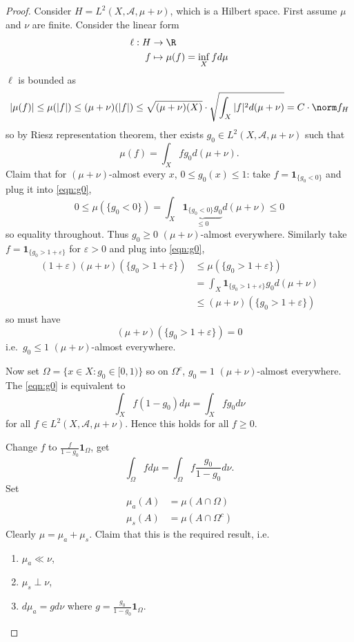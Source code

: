 \documentclass[a4paper]{article}
\begin{document}
\begin{proof}
  Consider \(H = L^2(X, \mathcal A, \mu + \nu)\), which is a Hilbert space. First assume \(\mu\) and \(\nu\) are finite. Consider the linear form
  \begin{align*}
    \ell: H &\to \R \\
    f &\mapsto \mu(f) = \inf_X f d\mu
  \end{align*}
  \(\ell\) is bounded as
  \[
    |\mu(f)|
    \leq \mu(|f|)
    \leq (\mu + \nu)(|f|)
    \leq \sqrt{(\mu + \nu)(X)} \cdot \sqrt{\int_X |f|^2 d(\mu + \nu)}
    = C \cdot \norm f_H
  \]
  so by Riesz representation theorem, ther exists \(g_0 \in L^2(X, \mathcal A, \mu + \nu)\) such that
  \[
    \label{eqn:g0}
    \mu(f) = \int_X fg_0 d(\mu + \nu).
    \tag{\ast}
  \]
  Claim that for \((\mu + \nu)\)-almost every \(x\), \(0 \leq g_0(x) \leq 1\): take \(f = \mathbf 1_{\{g_0 < 0\}}\) and plug it into \eqref{eqn:g0},
  \[
    0
    \leq \mu(\{g_0 < 0\})
    = \int_X \underbrace{\mathbf 1_{\{g_0 < 0\}} g_0}_{\leq 0} d(\mu + \nu)
    \leq 0
  \]
  so equality throughout. Thus \(g_0 \geq 0\) \((\mu + \nu)\)-almost everywhere. Similarly take \(f = \mathbf 1_{\{g_0 > 1 + \varepsilon\}}\) for \(\varepsilon > 0\) and plug into \eqref{eqn:g0},
  \begin{align*}
    (1 + \varepsilon)(\mu + \nu) (\{g_0 > 1 + \varepsilon\})
    &\leq \mu(\{g_0 > 1 + \varepsilon\}) \\
    &= \int_X \mathbf 1_{\{g_0 > 1 + \varepsilon\}} g_0 d(\mu + \nu) \\
    &\leq (\mu + \nu)(\{g_0 > 1 + \varepsilon\})
  \end{align*}
  so must have
  \[
    (\mu + \nu) (\{g_0 > 1 + \varepsilon\}) = 0
  \]
  i.e.\ \(g_0 \leq 1\) \((\mu + \nu)\)-almost everywhere.

  Now set \(\Omega = \{x \in X: g_0 \in [0, 1)\}\) so on \(\Omega^c\), \(g_0 = 1\) \((\mu + \nu)\)-almost everywhere. The \eqref{eqn:g0} is equivalent to
  \[
    \int_X f(1 - g_0) d\mu = \int_X fg_0 d\nu
  \]
  for all \(f \in L^2(X, \mathcal A, \mu + \nu)\). Hence this holds for all \(f \geq 0\).

  Change \(f\) to \(\frac{f}{1 - g_0} \mathbf 1_\Omega\), get
  \[
    \label{eqn:Radon-Nikodym}
    \int_\Omega f d\mu = \int_\Omega f \frac{g_0}{1 - g_0} d\nu.
    \tag{\ast\ast}
  \]
  Set
  \begin{align*}
    \mu_a(A) &= \mu(A \cap \Omega) \\
    \mu_s(A) &= \mu(A \cap \Omega^c)
  \end{align*}
  Clearly \(\mu = \mu_a + \mu_s\). Claim that this is the required result, i.e.
  \begin{enumerate}
  \item \(\mu_a \ll \nu\),
  \item \(\mu_s \perp \nu\),
  \item \(d\mu_a = gd\nu\) where \(g = \frac{g_0}{1 - g_0} \mathbf 1_\Omega\).
  \end{enumerate}


\end{proof}
\end{document}
